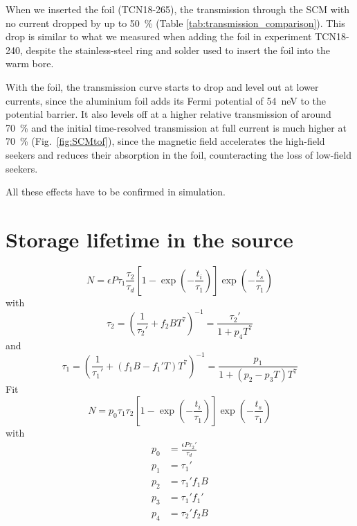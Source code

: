 \documentclass[10pt,letterpaper]{article}
\begin{document}
When we inserted the foil (TCN18-265), the transmission through the SCM with no current dropped by up to \SI{50}{\percent} (Table \ref{tab:transmission_comparison}). This drop is similar to what we measured when adding the foil in experiment TCN18-240, despite the stainless-steel ring and solder used to insert the foil into the warm bore.

With the foil, the transmission curve starts to drop and level out at lower currents, since the aluminium foil adds its Fermi potential of \SI{54}{\nano\electronvolt} to the potential barrier. It also levels off at a higher relative transmission of around \SI{70}{\percent} and the initial time-resolved transmission at full current is much higher at \SI{70}{\percent} (Fig.~\ref{fig:SCMtof}), since the magnetic field accelerates the high-field seekers and reduces their absorption in the foil, counteracting the loss of low-field seekers.

All these effects have to be confirmed in simulation.




\section{Storage lifetime in the source}
\label{sec:storagelifetime}

\iffalse

\begin{equation}
N = \epsilon P \tau_1 \frac{\tau_2}{\tau_d} \left[ 1 - \exp \left( -\frac{t_i}{\tau_1} \right) \right] \exp \left( -\frac{t_s}{\tau_1} \right)
\end{equation}
with
\begin{equation}
\tau_2 = \left( \frac{1}{\tau_2'} + f_2 B T^7 \right) ^{-1} = \frac{\tau_2'}{1 + p_4 T^7}
\end{equation}
and
\begin{equation}
\tau_1 = \left( \frac{1}{\tau_1'} + (f_1 B - f_1' T) T^7 \right) ^{-1} = \frac{p_1}{1 + (p_2 - p_3 T) T^7}
\end{equation}
Fit
\begin{equation}
N = p_0 \tau_1 \tau_2
    \left[ 1 - \exp \left( -\frac{t_i}{\tau_1} \right) \right]
    \exp \left( -\frac{t_s}{\tau_1} \right)
\end{equation}
with
\begin{eqnarray}
p_0 &= \frac{\epsilon P \tau_2'}{\tau_d} \\
p_1 &= \tau_1' \\
p_2 &= \tau_1' f_1 B \\
p_3 &= \tau_1' f_1' \\
p_4 &= \tau_2' f_2 B
\end{eqnarray}
\end{document}
